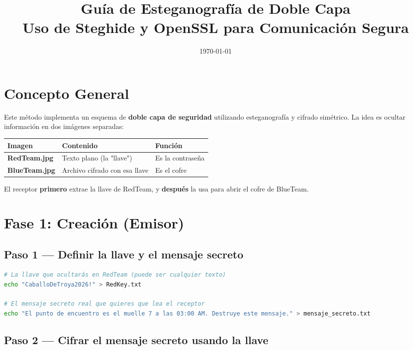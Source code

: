 \documentclass[11pt,a4paper]{article}
\title{\textbf{Guía de Esteganografía de Doble Capa}\\
\large Uso de Steghide y OpenSSL para Comunicación Segura}
\author{}
\date{\today}
\begin{document}
\maketitle

\tableofcontents
\newpage

\section{Concepto General}

Este método implementa un esquema de \textbf{doble capa de seguridad} utilizando esteganografía y cifrado simétrico. La idea es ocultar información en dos imágenes separadas:

\begin{table}[h]
\centering
\begin{tabular}{|l|l|l|}
\hline
\textbf{Imagen} & \textbf{Contenido} & \textbf{Función} \\
\hline
\textbf{RedTeam.jpg} & Texto plano (la "llave") & Es la contraseña \\
\hline
\textbf{BlueTeam.jpg} & Archivo cifrado con esa llave & Es el cofre \\
\hline
\end{tabular}
\end{table}

El receptor \textbf{primero} extrae la llave de RedTeam, y \textbf{después} la usa para abrir el cofre de BlueTeam.

\section{Fase 1: Creación (Emisor)}

\subsection{Paso 1 --- Definir la llave y el mensaje secreto}

\begin{lstlisting}[language=bash, caption={Crear archivos iniciales}]
# La llave que ocultarás en RedTeam (puede ser cualquier texto)
echo "CaballoDeTroya2026!" > RedKey.txt

# El mensaje secreto real que quieres que lea el receptor
echo "El punto de encuentro es el muelle 7 a las 03:00 AM. Destruye este mensaje." > mensaje_secreto.txt
\end{lstlisting}

\subsection{Paso 2 --- Cifrar el mensaje secreto usando la llave}
\end{document}
